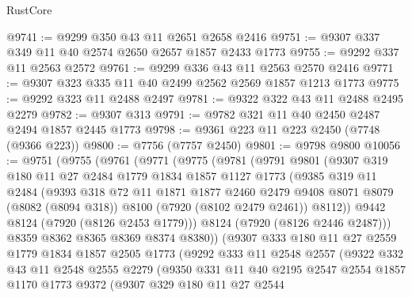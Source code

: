 \begin{lexlean}{RustCore}
\begin{coremodule}
@9741 := @9299 @350 @43 @11 @2651 @2658 @2416
@9751 := @9307 @337 @349 @11 @40 @2574 @2650 @2657 @1857 @2433 @1773
@9755 := @9292 @337 @11 @2563 @2572
@9761 := @9299 @336 @43 @11 @2563 @2570 @2416
@9771 := @9307 @323 @335 @11 @40 @2499 @2562 @2569 @1857 @1213 @1773
@9775 := @9292 @323 @11 @2488 @2497
@9781 := @9322 @322 @43 @11 @2488 @2495 @2279
@9782 := @9307 @313
@9791 := @9782 @321 @11 @40 @2450 @2487 @2494 @1857 @2445 @1773
@9798 := @9361 @223 @11 @223 @2450 (@7748 (@9366 @223))
@9800 := @7756 (@7757 @2450)
@9801 := @9798 @9800
@10056 := @9751
    (@9755
      (@9761
        (@9771
          (@9775
            (@9781
              (@9791
                @9801
                (@9307
                  @319
                  @180
                  @11
                  @27
                  @2484
                  @1779
                  @1834
                  @1857
                  @1127
                  @1773
                  (@9385
                    @319
                    @11
                    @2484
                    (@9393
                      @318
                      @72
                      @11
                      @1871
                      @1877
                      @2460
                      @2479
                      @9408
                      @8071
                      @8079
                      (@8082 (@8094 @318))
                      @8100
                      (@7920 (@8102 @2479 @2461))
                      @8112))
                  @9442
                  @8124
                  (@7920 (@8126 @2453 @1779)))
                @8124
                (@7920 (@8126 @2446 @2487)))
              @8359
              @8362
              @8365
              @8369
              @8374
              @8380))
          (@9307
            @333
            @180
            @11
            @27
            @2559
            @1779
            @1834
            @1857
            @2505
            @1773
            (@9292
              @333
              @11
              @2548
              @2557
              (@9322
                @332
                @43
                @11
                @2548
                @2555
                @2279
                (@9350
                  @331
                  @11
                  @40
                  @2195
                  @2547
                  @2554
                  @1857
                  @1170
                  @1773
                  @9372
                  (@9307
                    @329
                    @180
                    @11
                    @27
                    @2544

\end{coremodule}
\end{lexlean}
